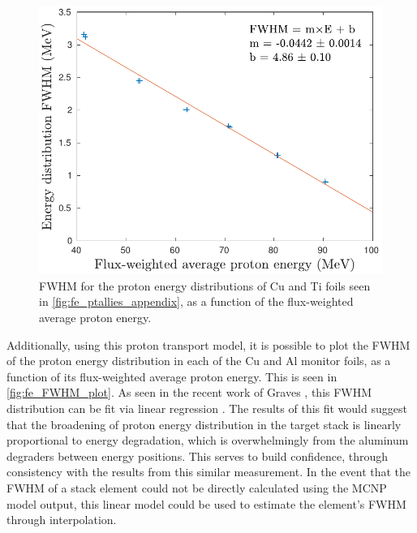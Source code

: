 





\begin{figure}
 \centering
 \includegraphics[width=0.5\columnwidth]{./figures/FWHM_plot.pdf}
 \caption{ FWHM for the proton energy distributions of Cu and Ti foils seen in \autoref{fig:fe_ptallies_appendix}, as a function of the flux-weighted average proton energy. }
 \label{fig:fe_FWHM_plot}
\end{figure}



Additionally, using this proton transport model, it is possible to plot the FWHM of the proton energy distribution in each of the Cu and Al monitor foils, as a function of its  flux-weighted average proton energy.
This is seen in \autoref{fig:fe_FWHM_plot}.
As seen in the recent work of Graves \etal, this FWHM distribution can be fit via linear regression \cite{Graves2016}.
The results of this fit  would suggest that the broadening of proton energy distribution in the target stack is linearly proportional to energy degradation, which is overwhelmingly from the aluminum degraders between energy positions.
This serves to build confidence, through consistency with the  results from this similar measurement.
In the event that the FWHM of a stack element could not be directly calculated using the MCNP model output, this linear model could be used to estimate the element's FWHM through interpolation. 



